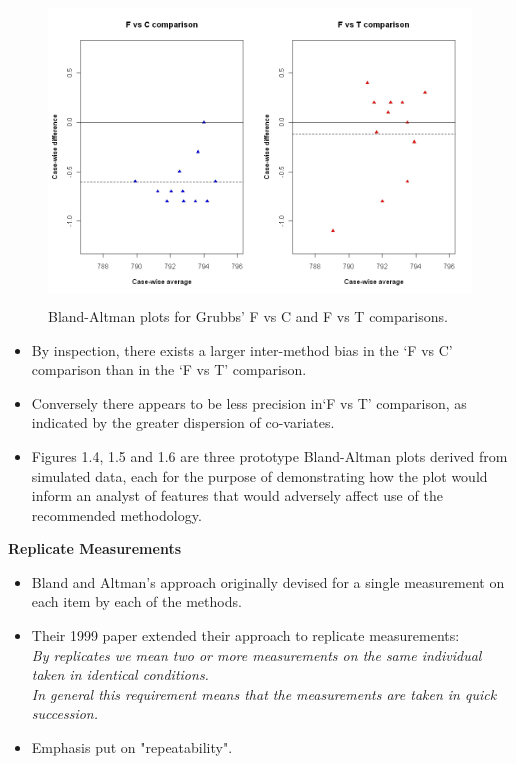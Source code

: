 \documentclass[compress]{beamer}        %
\makeatletter
\newcommand{\tcb}{\textcolor{beamer@blendedblue}}
\makeatother
\begin{document}
\begin{frame}

\begin{figure}[h!]
\begin{center}
  \includegraphics[height=80mm]{GrubbsDataTwoBAplots.jpeg}
  \caption{Bland-Altman plots for Grubbs' F vs C and F vs T comparisons.}\label{GrubbsDataTwoBAplots}
\end{center}
\end{figure}
\end{frame}
\begin{frame}
\begin{itemize}
\item By inspection, there exists a larger inter-method bias in the `F
vs C' comparison than in the `F vs T' comparison. 
\item Conversely there
appears to be less precision in`F vs T' comparison, as indicated
by the greater dispersion of co-variates.

\item Figures 1.4, 1.5 and 1.6 are three prototype Bland-Altman plots
derived from simulated data, each for the purpose of demonstrating
how the plot would inform an analyst of features that would
adversely affect use of the recommended methodology.
\end{itemize}

\end{frame}

\begin{frame}{\bf \tcb{Replicate Measurements}}
\begin{itemize}\itemsep0.7cm
\item Bland and Altman's approach originally devised for a single measurement on each item by each of the methods.
\item Their 1999 paper \cite{BA99} extended their approach to replicate measurements:\\ \emph{By replicates we mean two or more measurements on the same
individual taken in identical conditions. \\In general this requirement means that the
measurements are taken in quick succession. }
\item Emphasis put on "repeatability".
\end{itemize}
\end{frame}
\end{document}
